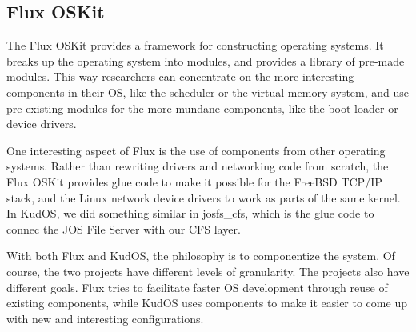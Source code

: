 \subsection{Flux OSKit}
\label{sec:related:flux}

The Flux OSKit \cite{ford97oskit} provides a framework for constructing
operating systems. It breaks up the operating system into modules, and provides
a library of pre-made modules. This way researchers can concentrate on the more
interesting components in their OS, like the scheduler or the virtual memory
system, and use pre-existing modules for the more mundane components, like the
boot loader or device drivers.

One interesting aspect of Flux is the use of components from other operating
systems. Rather than rewriting drivers and networking code from scratch, the
Flux OSKit provides glue code to make it possible for the FreeBSD TCP/IP stack,
and the Linux network device drivers to work as parts of the same kernel. In
KudOS, we did something similar in josfs\_cfs, which is the glue code to connec
the JOS File Server with our CFS layer.

With both Flux and KudOS, the philosophy is to componentize the system. Of
course, the two projects have different levels of granularity. The projects also
have different goals. Flux tries to facilitate faster OS development through
reuse of existing components, while KudOS uses components to make it easier to
come up with new and interesting configurations.
